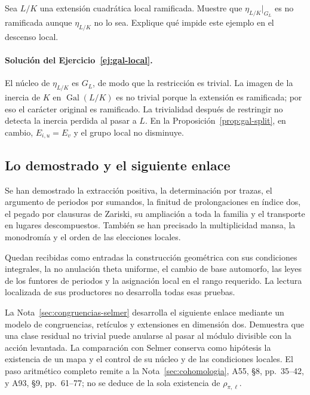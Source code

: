 \begin{ejercicio}\label{ej:gal-local}
Sea $L/K$ una extensión cuadrática local ramificada.
Muestre que $\eta_{L/K}|_{G_L}$ es no ramificada
aunque $\eta_{L/K}$ no lo sea.
Explique qué impide este ejemplo en el descenso local.
\end{ejercicio}

\paragraph{Solución del Ejercicio~\ref{ej:gal-local}.}
El núcleo de $\eta_{L/K}$ es $G_L$, de modo que la restricción
es trivial. La imagen de la inercia de $K$ en
$\operatorname{Gal}(L/K)$ es no trivial porque la extensión
es ramificada; por eso el carácter original es ramificado.
La trivialidad después de restringir no detecta la inercia
perdida al pasar a $L$.
En la Proposición~\ref{prop:gal-split}, en cambio,
$E_{i,u}=E_v$ y el grupo local no disminuye.

\subsection{Lo demostrado y el siguiente enlace}

Se han demostrado la extracción positiva, la determinación por
trazas, el argumento de periodos por sumandos, la finitud de
prolongaciones en índice dos, el pegado por clausuras de Zariski,
su ampliación a toda la familia y el transporte en lugares
descompuestos. También se han precisado la multiplicidad mansa,
la monodromía y el orden de las elecciones locales.

Quedan recibidas como entradas la construcción geométrica
con sus condiciones integrales, la no anulación theta uniforme,
el cambio de base automorfo, las leyes de los funtores de periodos
y la asignación local en el rango requerido.
La lectura localizada de sus productores no desarrolla todas
esas pruebas.

La Nota~\ref{sec:congruencias-selmer} desarrolla el siguiente enlace
mediante un modelo de congruencias, retículos y extensiones en
dimensión dos. Demuestra que una clase residual no trivial puede
anularse al pasar al módulo divisible con la acción levantada.
La comparación con Selmer conserva como hipótesis la existencia
de un mapa y el control de su núcleo y de las condiciones locales.
El paso aritmético completo remite a la Nota~\ref{sec:cohomologia},
A55, §8, pp.~35--42, y A93, §9, pp.~61--77;
no se deduce de la sola existencia de $\rho_{\pi,\ell}$.


